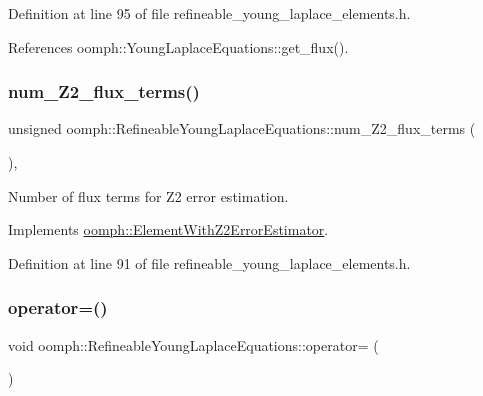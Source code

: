 Definition at line 95 of file refineable\+\_\+young\+\_\+laplace\+\_\+elements.\+h.



References oomph\+::\+Young\+Laplace\+Equations\+::get\+\_\+flux().

\mbox{\label{classoomph_1_1RefineableYoungLaplaceEquations_aef39cb1a9e6f4b117b840211fa8570cc}} 
\subsubsection{\texorpdfstring{num\+\_\+\+Z2\+\_\+flux\+\_\+terms()}{num\_Z2\_flux\_terms()}}
{\footnotesize\ttfamily unsigned oomph\+::\+Refineable\+Young\+Laplace\+Equations\+::num\+\_\+\+Z2\+\_\+flux\+\_\+terms (\begin{DoxyParamCaption}{ }\end{DoxyParamCaption})\hspace{0.3cm}{\ttfamily [inline]}, {\ttfamily [virtual]}}



Number of \textquotesingle{}flux\textquotesingle{} terms for Z2 error estimation. 



Implements \hyperlink{classoomph_1_1ElementWithZ2ErrorEstimator_ae82c5728902e13da31be19c390fc28e3}{oomph\+::\+Element\+With\+Z2\+Error\+Estimator}.



Definition at line 91 of file refineable\+\_\+young\+\_\+laplace\+\_\+elements.\+h.

\mbox{\label{classoomph_1_1RefineableYoungLaplaceEquations_ac03b660ba90fe5fd1ea5d734f6a41aa7}} 
\subsubsection{\texorpdfstring{operator=()}{operator=()}}
{\footnotesize\ttfamily void oomph\+::\+Refineable\+Young\+Laplace\+Equations\+::operator= (\begin{DoxyParamCaption}\item[{const \hyperlink{classoomph_1_1RefineableYoungLaplaceEquations}{Refineable\+Young\+Laplace\+Equations} \&}]{ }\end{DoxyParamCaption})\hspace{0.3cm}{\ttfamily [inline]}}



